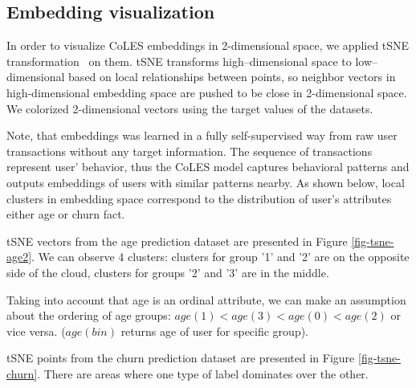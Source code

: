 \documentclass[sigconf]{acmart}
\begin{document}
\fi

\iffalse

\subsection{Embedding visualization} \label{app-sec-vis}

In order to visualize CoLES embeddings in 2-dimensional space, we applied tSNE transformation~\citep{Maaten2008VisualizingDU} on them. tSNE transforms high--dimensional space to low--dimensional based on local relationships between points, so neighbor vectors in high-dimensional embedding space are pushed to be close in 2-dimensional space. We colorized 2-dimensional vectors using the target values of the datasets.

Note, that embeddings was learned in a fully self-supervised way from raw user transactions without any target information. The sequence of transactions represent user' behavior, thus the CoLES model captures behavioral patterns and outputs embeddings of users with similar patterns nearby.
As shown below, local clusters in embedding space correspond to the distribution of user's attributes either age or churn fact.

tSNE vectors from the age prediction dataset are presented in Figure \ref{fig-tsne-age2}. We can observe 4 clusters: clusters for group '1' and '2' are on the opposite side of the cloud, clusters for groups '2' and '3' are in the middle.

Taking into account that age is an ordinal attribute, we can make an assumption about the ordering of age groups: $age(1) < age(3) < age(0) < age(2)$ or vice versa. ($age(bin)$ returns age of user for specific group).

tSNE points from the churn prediction dataset are presented in Figure \ref{fig-tsne-churn}. There are areas where one type of label dominates over the other.
\end{document}
